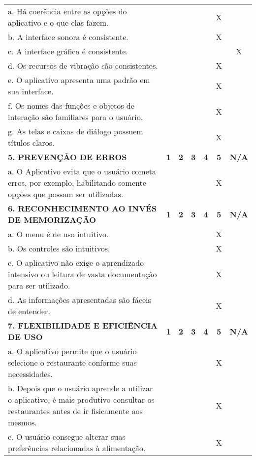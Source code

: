 \documentclass[portuguese,oneside]{tcc}
\begin{document}
\begin{center}
\begin{longtabu}{|L{25em}|c|c|c|c|c|c|}
							a. Há coerência entre as opções do aplicativo e o que elas fazem. & & & & & X & \\ 
							b. A interface sonora é consistente. & & & & & X & \\ 
							c. A interface gráfica é consistente. & & & & & & X \\ 
							d. Os recursos de vibração são consistentes. & & & & & X & \\ 
							e. O aplicativo apresenta uma padrão em sua interface. & & & & & X & \\ 
							f. Os nomes das funções e objetos de interação são familiares para o usuário. & & & & & X & \\ 
							g. As telas e caixas de diálogo possuem títulos claros. & & & & & X & \\ 
							\textbf{5. PREVENÇÃO DE ERROS} & \textbf{1} & \textbf{2} & \textbf{3} & \textbf{4} & \textbf{5} & \textbf{N/A} \\ 
							a. O Aplicativo evita que o usuário cometa erros, por exemplo, habilitando somente opções que possam ser utilizadas. & & & & & X & \\ 
							\textbf{6. RECONHECIMENTO AO INVÉS DE MEMORIZAÇÃO} & \textbf{1} & \textbf{2} & \textbf{3} & \textbf{4} & \textbf{5} & \textbf{N/A} \\ 
							a. O  menu é de uso intuitivo. & & & & & X & \\ 
							b. Os controles são intuitivos. & & & & & X & \\ 
							c. O aplicativo não exige o aprendizado intensivo ou leitura de vasta documentação para ser utilizado. & & & & & X & \\ 
							d. As informações apresentadas são fáceis de entender. & & & & & X & \\ 
							\textbf{7. FLEXIBILIDADE E EFICIÊNCIA DE USO} & \textbf{1} & \textbf{2} & \textbf{3} & \textbf{4} & \textbf{5} & \textbf{N/A} \\ 
							a. O aplicativo permite que o usuário selecione o restaurante conforme suas necessidades. & & & & & X & \\ 
							b. Depois que o usuário aprende a utilizar o aplicativo, é mais produtivo consultar os restaurantes antes de ir fisicamente aos mesmos. & & & & & X & \\ 
							c. O usuário consegue alterar suas preferências relacionadas à alimentação. & & & & & X & \\ 

\end{longtabu}
\end{center}
\end{document}
